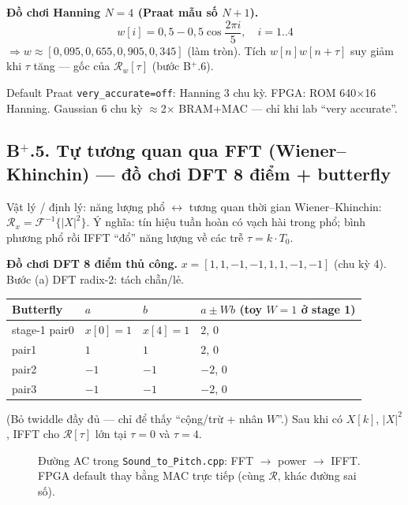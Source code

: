 \noindent\textbf{Đồ chơi Hanning $N=4$ (Praat mẫu số $N+1$).}
\[
w[i]=0{,}5-0{,}5\cos\frac{2\pi i}{5},\quad i=1..4
\]
$\Rightarrow w\approx[0{,}095,0{,}655,0{,}905,0{,}345]$ (làm tròn). Tích $w[n]w[n+\tau]$ suy giảm khi $\tau$ tăng --- gốc của $\mathcal{R}_w[\tau]$ (bước B$^+$.6).

\begin{costbox}
Default Praat \texttt{very\_accurate=off}: Hanning 3 chu kỳ. FPGA: ROM 640$\times$16 Hanning. Gaussian 6 chu kỳ $\approx$2$\times$ BRAM+MAC --- chỉ khi lab ``very accurate''.
\end{costbox}

\subsection*{B$^+$.5. Tự tương quan qua FFT (Wiener--Khinchin) --- đồ chơi DFT 8 điểm + butterfly}

\begin{firstprin}{Vật lý / định lý: năng lượng phổ $\leftrightarrow$ tương quan thời gian}
Wiener--Khinchin: $\mathcal{R}_x = \mathcal{F}^{-1}\{|X|^2\}$. Ý nghĩa: tín hiệu tuần hoàn có vạch hài trong phổ; bình phương phổ rồi IFFT ``đổ'' năng lượng về các trễ $\tau = k\cdot T_0$.
\end{firstprin}

\noindent\textbf{Đồ chơi DFT 8 điểm thủ công.} $x=[1,1,-1,-1,1,1,-1,-1]$ (chu kỳ 4).
Bước (a) DFT radix-2: tách chẵn/lẻ.
\begin{center}\small
\begin{tabular}{@{}llll@{}}
\toprule
Butterfly & $a$ & $b$ & $a\pm W b$ (toy $W=1$ ở stage 1) \\
\midrule
stage-1 pair0 & $x[0]=1$ & $x[4]=1$ & $2$, $0$ \\
pair1 & $1$ & $1$ & $2$, $0$ \\
pair2 & $-1$ & $-1$ & $-2$, $0$ \\
pair3 & $-1$ & $-1$ & $-2$, $0$ \\
\bottomrule
\end{tabular}
\end{center}
(Bỏ twiddle đầy đủ --- chỉ để thấy ``cộng/trừ + nhân $W$''.) Sau khi có $X[k]$, $|X|^2$, IFFT cho $\mathcal{R}[\tau]$ lớn tại $\tau=0$ và $\tau=4$.

\begin{figure}[H]
\centering
{}
\caption{Đường AC trong \texttt{Sound\_to\_Pitch.cpp}: FFT $\to$ power $\to$ IFFT. FPGA default thay bằng MAC trực tiếp (cùng $\mathcal{R}$, khác đường sai số).}
\end{figure}

